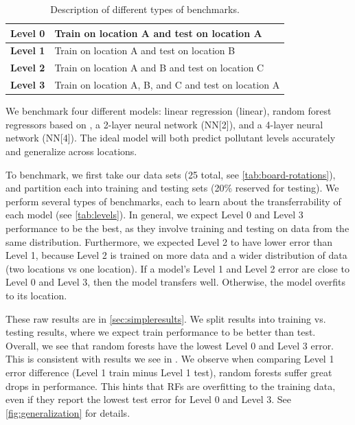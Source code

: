 \documentclass[journal abbreviation, manuscript]{copernicus}
\begin{document}
\begin{table}[H]
\centering
\begin{tabular}{|l|l|}
\hline
\textbf{Level 0} & Train on location A and test on location A \\ \hline
\textbf{Level 1} & Train on location A and test on location B \\ \hline
\textbf{Level 2} & Train on location A and B and test on location C \\ \hline
\textbf{Level 3} & Train on location A, B, and C and test on location A \\ \hline
\end{tabular}
\caption{Description of different types of benchmarks.}
\label{tab:levels}
\end{table}

We benchmark four different models: linear regression (linear), random forest regressors based on \citep{Zimmerman2018},
a 2-layer neural network (NN[2]), and a 4-layer neural network (NN[4]). The ideal model will
both predict pollutant levels accurately and
generalize across locations.

To benchmark, we first take our data sets (25 total, see \autoref{tab:board-rotations}), and partition each into training and testing sets (20\% reserved for testing).
We perform several types of benchmarks,
each to learn about the transferrability of each model (see \autoref{tab:levels}).
In general, we expect Level 0 and Level 3 performance to be the best, as they involve training and testing on data from the same distribution. Furthermore, we expected Level 2 to have lower error than Level 1, because Level 2 is trained on more data and a wider distribution of data (two locations vs one location).
If a model's Level 1 and Level 2 error are close to Level 0 and Level 3, then the model transfers well. Otherwise, the model overfits to its location.


These raw results are in \autoref{sec:simpleresults}. 
We split results into training vs. testing
results, where we expect train performance
to be better than test.
Overall, we see that random forests have the lowest Level 0 and Level 3 error. This is consistent with results we see in \citet{Zimmerman2018}. 
We observe when comparing Level 1 error difference (Level 1 train minus Level 1 test), random forests suffer great
drops in performance.
This hints that RFs are overfitting to the training data, even if they
report the lowest test error for Level 0 and Level 3.  See \autoref{fig:generalization} for 
details.
\end{document}
